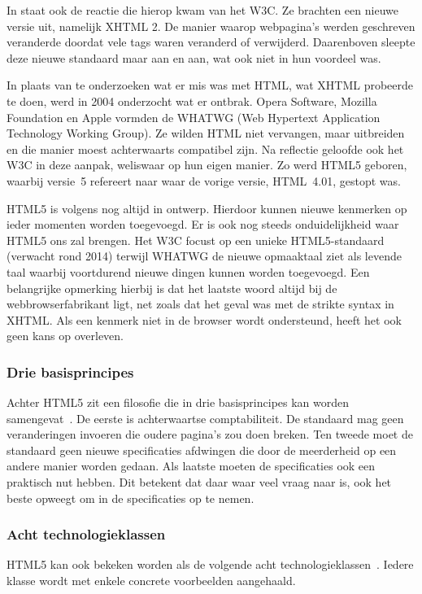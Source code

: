 In \cite{MacDonald2011} staat ook de reactie die hierop kwam van het W3C.  
Ze brachten een nieuwe versie uit, namelijk XHTML 2.
De manier waarop webpagina's werden geschreven veranderde doordat vele tags waren veranderd of verwijderd. 
Daarenboven sleepte deze nieuwe standaard maar aan en aan, wat ook niet in hun voordeel was. 

In plaats van te onderzoeken wat er mis was met HTML, wat XHTML probeerde te doen, werd in 2004 onderzocht wat er ontbrak. 
Opera Software, Mozilla Foundation en Apple vormden de WHATWG (Web Hypertext Application Technology Working Group). 
Ze wilden HTML niet vervangen, maar uitbreiden en die manier moest achterwaarts compatibel zijn. 
Na reflectie geloofde ook het W3C in deze aanpak, weliswaar op hun eigen manier.  
Zo werd HTML5 geboren, waarbij versie~5 refereert naar waar de vorige versie, HTML~4.01, gestopt was.

HTML5 is volgens \cite{MacDonald2011} nog altijd in ontwerp. 
Hierdoor kunnen nieuwe kenmerken op ieder momenten worden toegevoegd.  
Er is ook nog steeds onduidelijkheid waar HTML5 ons zal brengen.  
Het W3C focust op een unieke HTML5-standaard (verwacht rond 2014) terwijl WHATWG de nieuwe opmaaktaal ziet als levende taal waarbij voortdurend  nieuwe dingen kunnen worden toegevoegd. 
Een belangrijke opmerking hierbij is dat het laatste woord altijd bij de webbrowserfabrikant ligt, net zoals dat het geval was met de strikte syntax in XHTML. 
Als een kenmerk niet in de browser wordt ondersteund, heeft het ook geen kans op overleven.

\subsubsection{Drie basisprincipes}
Achter HTML5 zit een filosofie die in drie basisprincipes kan worden samengevat~\cite{MacDonald2011}.  
De eerste is achterwaartse comptabiliteit. 
De standaard mag geen veranderingen invoeren die oudere pagina's zou doen breken. 
Ten tweede moet de standaard geen nieuwe specificaties afdwingen die door de meerderheid op een andere manier worden gedaan. 
Als laatste moeten de specificaties ook een praktisch nut hebben. 
Dit betekent dat daar waar veel vraag naar is, ook het beste opweegt om in de specificaties op te nemen.

\subsubsection{Acht technologieklassen}
HTML5 kan ook bekeken worden als de volgende acht technologieklassen~\cite{W3C2012}. 
Iedere klasse wordt met enkele concrete voorbeelden aangehaald.

